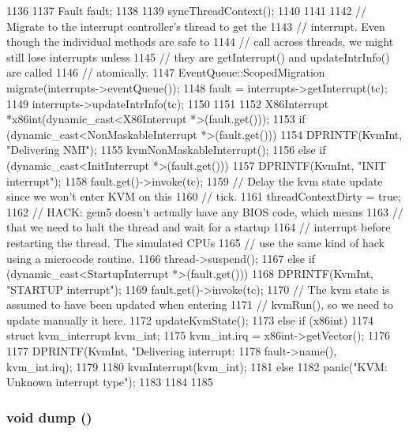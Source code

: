 \begin{DoxyCode}
1136 {
1137     Fault fault;
1138 
1139     syncThreadContext();
1140 
1141     {
1142         // Migrate to the interrupt controller's thread to get the
1143         // interrupt. Even though the individual methods are safe to
1144         // call across threads, we might still lose interrupts unless
1145         // they are getInterrupt() and updateIntrInfo() are called
1146         // atomically.
1147         EventQueue::ScopedMigration migrate(interrupts->eventQueue());
1148         fault = interrupts->getInterrupt(tc);
1149         interrupts->updateIntrInfo(tc);
1150     }
1151 
1152     X86Interrupt *x86int(dynamic_cast<X86Interrupt *>(fault.get()));
1153     if (dynamic_cast<NonMaskableInterrupt *>(fault.get())) {
1154         DPRINTF(KvmInt, "Delivering NMI\n");
1155         kvmNonMaskableInterrupt();
1156     } else if (dynamic_cast<InitInterrupt *>(fault.get())) {
1157         DPRINTF(KvmInt, "INIT interrupt\n");
1158         fault.get()->invoke(tc);
1159         // Delay the kvm state update since we won't enter KVM on this
1160         // tick.
1161         threadContextDirty = true;
1162         // HACK: gem5 doesn't actually have any BIOS code, which means
1163         // that we need to halt the thread and wait for a startup
1164         // interrupt before restarting the thread. The simulated CPUs
1165         // use the same kind of hack using a microcode routine.
1166         thread->suspend();
1167     } else if (dynamic_cast<StartupInterrupt *>(fault.get())) {
1168         DPRINTF(KvmInt, "STARTUP interrupt\n");
1169         fault.get()->invoke(tc);
1170         // The kvm state is assumed to have been updated when entering
1171         // kvmRun(), so we need to update manually it here.
1172         updateKvmState();
1173     } else if (x86int) {
1174         struct kvm_interrupt kvm_int;
1175         kvm_int.irq = x86int->getVector();
1176 
1177         DPRINTF(KvmInt, "Delivering interrupt: %
1178                 fault->name(), kvm_int.irq);
1179 
1180         kvmInterrupt(kvm_int);
1181     } else {
1182         panic("KVM: Unknown interrupt type\n");
1183     }
1184 
1185 }
\end{DoxyCode}
\hypertarget{classX86KvmCPU_accd2600060dbaee3a3b41aed4034c63c}{
\subsubsection[{dump}]{\setlength{\rightskip}{0pt plus 5cm}void dump ()}}
\label{classX86KvmCPU_accd2600060dbaee3a3b41aed4034c63c}


